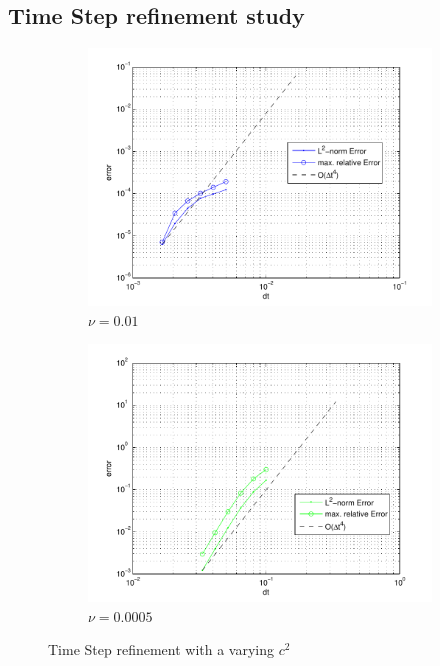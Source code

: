 \subsection{Time Step refinement study}

\begin{figure}[!tbhp]
\centering
	\begin{subfigure}{0.48\textwidth}
		\centering
		\includegraphics[width=\textwidth]{./figures/wErrorVSdt_nu0p01_varyingC2.pdf}	
		\caption{$\nu=0.01$}
	\end{subfigure}
	\begin{subfigure}{0.48\textwidth}
		\centering
		\includegraphics[width=\textwidth]{./figures/wErrorVSdt_nu0p0005_varyingC2.pdf}	
		\caption{$\nu=0.0005$}
	\end{subfigure}
\caption{Time Step refinement with a varying $c^2$}
\label{fig:wErrorVSdt_varyingC2}
\end{figure}





\newpage

%
%

%